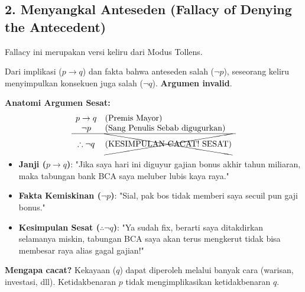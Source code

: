 \subsection{2. Menyangkal Anteseden (Fallacy of Denying the Antecedent)}

Fallacy ini merupakan versi keliru dari Modus Tollens.

\begin{teorema}
Dari implikasi ($p \rightarrow q$) dan fakta bahwa anteseden salah ($\neg p$), seseorang keliru menyimpulkan konsekuen juga salah ($\neg q$). \textbf{Argumen invalid}.
\end{teorema}

\textbf{Anatomi Argumen Sesat:}
\[
\begin{array}{cl}
p \rightarrow q & \text{(Premis Mayor)} \\
\neg p & \text{(Sang Penulis Sebab digugurkan)} \\
\hline
\therefore \neg q & \text{\xcancel{(KESIMPULAN CACAT! SESAT)}}
\end{array}
\]

\begin{contoh}
\begin{itemize}
    \item \textbf{Janji ($p \rightarrow q$)}: "Jika saya hari ini diguyur gajian bonus akhir tahun miliaran, maka tabungan bank BCA saya meluber lubis kaya raya."
    \item \textbf{Fakta Kemiskinan ($\neg p$)}: "Sial, pak bos tidak memberi saya secuil pun gaji bonus."
    \item \textbf{Kesimpulan Sesat ($\therefore \neg q$)}: "Ya sudah fix, berarti saya ditakdirkan selamanya miskin, tabungan BCA saya akan terus mengkerut tidak bisa membesar raya alias gagal gajian!"
\end{itemize}
\textbf{Mengapa cacat?} Kekayaan ($q$) dapat diperoleh melalui banyak cara (warisan, investasi, dll). Ketidakbenaran $p$ tidak mengimplikasikan ketidakbenaran $q$.
\end{contoh}
